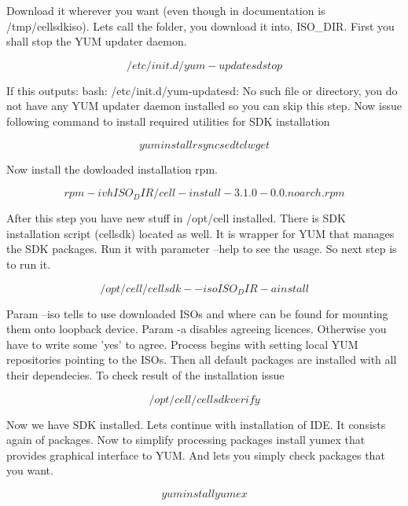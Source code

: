 \documentclass{article}
\begin{document}
Download it wherever you want (even though in documentation is /tmp/cellsdkiso). Lets call the folder, you download it into, ISO_DIR.  First you shall stop the YUM updater daemon.

\begin{equation}
/etc/init.d/yum-updatesd stop
\end{equation}

If this outputs: bash: /etc/init.d/yum-updatesd: No such file or directory, you do not have any YUM updater daemon installed so you can skip this step. Now issue following command to install required utilities for SDK installation

\begin{equation}
yum install rsync sed tcl wget
\end{equation}

Now install the dowloaded installation rpm.

\begin{equation}
rpm -ivh ISO_DIR/cell-install-3.1.0-0.0.noarch.rpm
\end{equation}

After this step you have new stuff in /opt/cell installed. There is SDK installation script (cellsdk) located as well. It is wrapper for YUM that manages the SDK packages. Run it with parameter --help to see the usage. So next step is to run it. 

\begin{equation}
/opt/cell/cellsdk --iso ISO_DIR -a install
\end{equation}

Param --iso tells to use downloaded ISOs and where can be found for mounting them onto loopback device. Param -a disables agreeing licences. Otherwise you have to write some 'yes' to agree. Process begins with setting local YUM repositories pointing to the ISOs. Then all default packages are installed with all their dependecies. To check result of the installation issue

\begin{equation}
/opt/cell/cellsdk verify
\end{equation}

Now we have SDK installed. Lets continue with installation of IDE. It consists again of packages. Now to simplify processing packages install yumex that provides graphical interface to YUM. And lets you simply check packages that you want.

\begin{equation}
yum install yumex
\end{equation}
\end{document}
